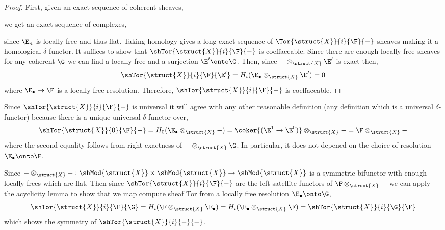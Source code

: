 \documentclass[12pt]{article}
\begin{document}
\begin{proof}
First, given an exact sequence of coherent sheaves,
\begin{center}
\end{center}
we get an exact sequence of complexes,
\begin{center}
\end{center}
since $\E_n$ is locally-free and thus flat. Taking homology gives a long exact sequence of $\Tor{\struct{X}}{i}{\F}{-}$ sheaves making it a homological $\delta$-functor.
It suffices to show that $\shTor{\struct{X}}{i}{\F}{-}$ is coeffaceable. Since there are enough locally-free sheaves for any coherent $\G$ we can find a locally-free and a surjection $\E' \onto \G$. Then, since $- \otimes_{\struct{X}} \E'$ is exact then,
\[ \shTor{\struct{X}}{i}{\F}{\E'} = H_i(\E_\bullet \otimes_{\struct{X}} \E') = 0 \]
where $\E_\bullet \to \F$ is a locally-free resolution. Therefore, $\shTor{\struct{X}}{i}{\F}{-}$ is coeffaceable.
\end{proof}

\begin{rmk}
Since $\shTor{\struct{X}}{i}{\F}{-}$ is universal it will agree with any other reasonable definition (any definition which is a universal $\delta$-functor) because there is a unique universal $\delta$-functor over,
\[ \shTor{\struct{X}}{0}{\F}{-} = H_0(\E_\bullet \otimes_{\struct{X}} -) = \coker{(\E^1 \to \E^0)} \otimes_{\struct{X}} - = \F \otimes_{\struct{X}} - \]
where the second equality follows from right-exactness of $- \otimes_{\struct{X}} \G$. In particular, it does not depened on the choice of resolution $\E_\bullet \onto \F$.
\end{rmk}

\begin{rmk}
Since $- \otimes_{\struct{X}} - : \shMod{\struct{X}} \times \shMod{\struct{X}} \to \shMod{\struct{X}}$ is a symmetric bifunctor with enough locally-frees which are flat. Then since $\shTor{\struct{X}}{i}{\F}{-}$ are the left-satellite functors of $\F \otimes_{\struct{X}} -$ we can apply the acyclicity lemma to show that we map compute sheaf Tor from a locally free resolution $\E_\bullet \onto \G$,
\[ \shTor{\struct{X}}{i}{\F}{\G} = H_i(\F \otimes_{\struct{X}} \E_\bullet) = H_i(\E_\bullet \otimes_{\struct{X}} \F) = \shTor{\struct{X}}{i}{\G}{\F} \]
which shows the symmetry of $\shTor{\struct{X}}{i}{-}{-}$. 
\end{rmk}
\end{document}
